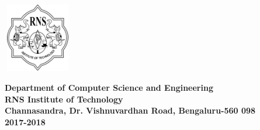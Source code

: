 \begin{titlepage}
\begin{center}
\includegraphics[width=3cm, height=3cm]{./RNS_logo.png}

\textup{\normalsize {\textcolor{darkbrown}{\bf Department of Computer Science and Engineering} \\ {\textcolor{darkbrown}{\bf \bf{RNS Institute of Technology}}}}}\\
\textup{\small {\textcolor{darkbrown}{\bf Channasandra, Dr. Vishnuvardhan Road, Bengaluru-560 098}\\ \textbf {\textcolor{darkbrown}{2017-2018}}}}



\end{center}
\end{titlepage}
